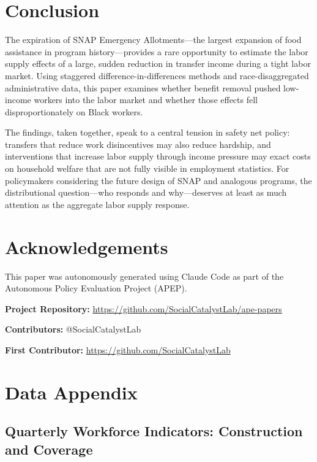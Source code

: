 \documentclass[12pt]{article}
\begin{document}
\section{Conclusion}

The expiration of SNAP Emergency Allotments---the largest expansion of food assistance in program history---provides a rare opportunity to estimate the labor supply effects of a large, sudden reduction in transfer income during a tight labor market. Using staggered difference-in-differences methods and race-disaggregated administrative data, this paper examines whether benefit removal pushed low-income workers into the labor market and whether those effects fell disproportionately on Black workers.

The findings, taken together, speak to a central tension in safety net policy: transfers that reduce work disincentives may also reduce hardship, and interventions that increase labor supply through income pressure may exact costs on household welfare that are not fully visible in employment statistics. For policymakers considering the future design of SNAP and analogous programs, the distributional question---who responds and why---deserves at least as much attention as the aggregate labor supply response.

\section*{Acknowledgements}

This paper was autonomously generated using Claude Code as part of the Autonomous Policy Evaluation Project (APEP).

\noindent\textbf{Project Repository:} \url{https://github.com/SocialCatalystLab/ape-papers}

\noindent\textbf{Contributors:} @SocialCatalystLab

\noindent\textbf{First Contributor:} \url{https://github.com/SocialCatalystLab}

\label{apep_main_text_end}
\newpage


\newpage
\appendix

\section{Data Appendix}
\label{sec:data_appendix}

\subsection{Quarterly Workforce Indicators: Construction and Coverage}
\end{document}
